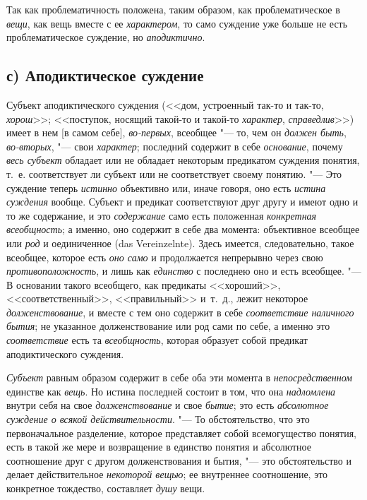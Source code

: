 {{\label{bkm:bm66b}Так как проблематичность положена, таким
образом, как проблематическое в
{\em вещи}, как вещь
вместе с ее {\em характером},
то само суждение уже больше не есть проблематическое
суждение, но {\em аподиктично}.

\subsection[с) Аподиктическое суждение]{с) Аподиктическое суждение}
Субъект аподиктического суждения (<<дом, устроенный так-то и
так-то, {\em хорош}>>;
<<поступок, носящий такой-то и такой-то
{\em характер},
{\em справедлив}>>) имеет в
нем [в самом себе], {\em во-первых},
всеобщее "--- то, чем он
{\em должен быть},
{\em во-вторых}, "--- свои
{\em характер}; последний
содержит в себе {\em основание},
почему {\em весь субъект}
обладает или не обладает некоторым предикатом суждения
понятия, т.~е. соответствует ли субъект или не соответствует своему
понятию. "--- Это суждение теперь
{\em истинно} объективно
или, иначе говоря, оно есть {\em истина
суждения} вообще. Субъект и предикат соответствуют друг
другу и имеют одно и то же содержание, и это
{\em содержание} само
есть положенная {\em конкретная
всеобщность}; а именно, оно содержит в себе два момента:
объективное всеобщее или {\em род}
и оединиченное (das Vereinzelnte). Здесь
имеется, следовательно, такое всеобщее, которое есть
{\em оно само} и
продолжается непрерывно через свою
{\em противоположность},
и лишь как {\em единство}
с последнею оно и есть всеобщее. "--- В основании
такого всеобщего, как предикаты <<хороший>>, <<соответственный>>, <<правильный>>
и~т.~д., лежит некоторое
{\em долженствование}, и
вместе с тем оно содержит в себе
{\em соответствие наличного бытия};
не указанное долженствование или род сами по себе, а именно
это {\em соответствие}
есть та
{\em всеобщность},
которая образует собой предикат аподиктического суждения.

{\em Субъект} равным
образом содержит в себе оба эти момента в
{\em непосредственном}
единстве как {\em вещь}.
Но истина последней состоит в том, что она
{\em надломлена} внутри
себя на свое {\em долженствование}
и свое {\em бытие};
это есть {\em абсолютное
суждение о всякой действительности}. "--- То обстоятельство,
что это первоначальное разделение, которое представляет собой всемогущество
понятия, есть в такой же мере и возвращение в единство понятия и абсолютное
соотношение друг с другом долженствования и бытия, "--- это
обстоятельство и делает действительное
{\em некоторой вещью}; ее
внутреннее соотношение, это конкретное тождество, составляет
{\em душу} вещи.

}}
